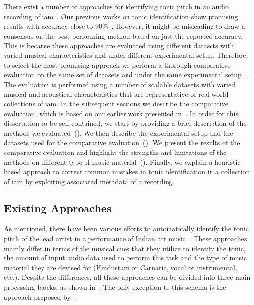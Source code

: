 There exist a number of approaches for identifying tonic pitch in an audio recording of \gls{iam}~\citep{salamon2012multipitch,gulati2012two,bellur2012knowledge,ranjani2011carnatic,Sengupta2005b}. Our previous works on tonic identification show promising results with accuracy close to 90\%~\citep{salamon2012multipitch,gulati2012two}. However, it might be misleading to draw a consensus on the best performing method based on just the reported accuracy. This is because these approaches are evaluated using different datasets with varied musical characteristics and under different experimental setup. Therefore, to select the most promising approach we perform a thorough comparative evaluation on the same set of datasets and under the same experimental setup~\citep{Gulati2014Tonic}. The evaluation is performed using a number of scalable datasets with varied musical and acoustical characteristics that are representative of real-world collections of \gls{iam}. In the subsequent sections we describe the comparative evaluation, which is based on our earlier work presented in~\cite{Gulati2014Tonic}. In order for this dissertation to be self-contained, we start by providing a brief description of the methods we evaluated~(). We then describe the experimental setup and the datasets used for the comparative evaluation~(). We present the results of the comparative evaluation and highlight the strengths and limitations of the methods on different type of music material~(). Finally, we explain a heuristic-based approach to correct common mistakes in tonic identification in a collection of \gls{iam} by exploiting associated metadata of a recording. 


\subsection{Existing Approaches}
\label{sec:pre_processing_tonic_identification_existing_approaches}

As mentioned, there have been various efforts to automatically identify the tonic pitch of the
lead artist in a performance of Indian art music~\citep{salamon2012multipitch,gulati2012two,bellur2012knowledge,ranjani2011carnatic,Sengupta2005b}.
These approaches mainly differ in terms of the musical cues that they utilize to
identify the tonic, the amount of input audio data used to perform this task and the type
of music material they are devised for (Hindustani or Carnatic, vocal or
instrumental, etc.). Despite the differences, all these approaches can be divided
into three main processing blocks, as shown in~. The only exception to this schema is the approach proposed by~\citep{Sengupta2005b}.

